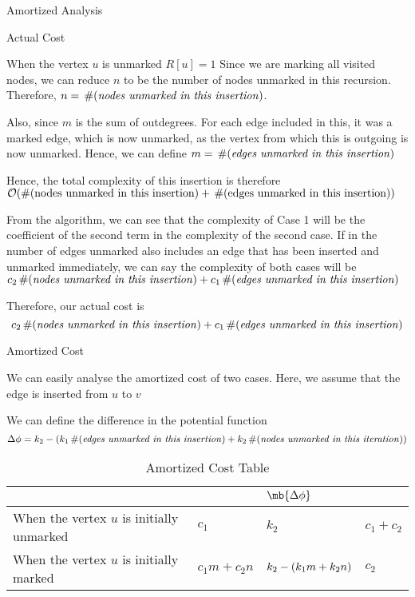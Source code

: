 \documentclass{article}
\begin{document}
\begin{question}
\begin{qsection}{Amortized Analysis}
\begin{qsubsection}{Actual Cost}
\begin{qcase}{2}{When the vertex $u$ is unmarked  $R[u] = 1$}
				Since we are marking all visited nodes, we can reduce $n$ to be the number of nodes unmarked in this recursion. Therefore, $n = \,\#(\text{\textit{nodes unmarked in this insertion}})$. \br%

				Also, since $m$ is the sum of outdegrees. For each edge included in this, it was a marked edge, which is now unmarked, as the vertex from which this is outgoing is now unmarked. Hence, we can define $m = \,\#(\text{\textit{edges unmarked in this insertion}})$ \br%

				Hence, the total complexity of this insertion is therefore $\mathcal{O}(\#(\text{nodes unmarked in this insertion}) + \,\#(\text{edges unmarked in this insertion}))$
			\end{qcase}

			From the algorithm, we can see that the complexity of Case 1 will be the coefficient of the second term in the complexity of the second case. If in the number of edges unmarked also includes an edge that has been inserted and unmarked immediately, we can say the complexity of both cases will be $c_2 \,\#(\text{\textit{nodes unmarked in this insertion}}) + c_1 \,\#(\text{\textit{edges unmarked in this insertion}})$

			Therefore, our actual cost is
			\[c_2 \,\#(\text{\textit{nodes unmarked in this insertion}}) + c_1 \,\#(\text{\textit{edges unmarked in this insertion}})\]

		\end{qsubsection}

		\begin{qsubsection}{Amortized Cost}

			We can easily analyse the amortized cost of two cases. Here, we assume that the edge is inserted from $u$ to $v$ \br%

			We can define the difference in the potential function
			\[\Delta \phi = k_2 - \left( k_1 \,\#(\text{\textit{edges unmarked in this insertion}}) + k_2 \,\#(\text{\textit{nodes unmarked in this iteration}}) \right)\] \br%

			\begin{table}[h!]
				\centering
				\begin{tabular}{| X{5cm} | X{3cm} | X{3cm} | X{3cm} |}
					\hline
					\tb{Case}									& \tb{Actual Cost}	& $\mb{\Delta \phi}$			& \tb{Amortized Cost} \\
					\hline
					When the vertex $u$ is initially unmarked	& $c_1$				& $k_2$							& $c_1 + c_2$ \\
					\hline
					When the vertex $u$ is initially marked		& $c_1 m + c_2 n$	& $k_2 - \left( k_1 m + k_2 n \right)$	& $c_2$ \\
					\hline
				\end{tabular}
				\caption{Amortized Cost Table}
			\end{table}


\end{qsubsection}
\end{qsection}
\end{question}
\end{document}
